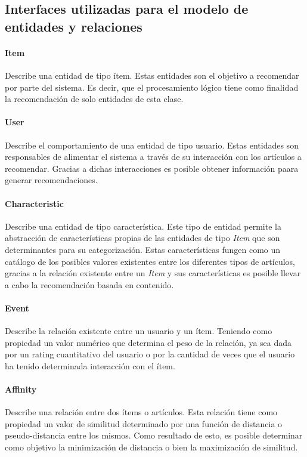 \subsection{Interfaces utilizadas para el modelo de entidades y relaciones}
\paragraph{Item}
Describe una entidad de tipo ítem. Estas entidades son el objetivo a recomendar por parte del sistema. Es decir, que el procesamiento lógico tiene como finalidad la recomendación de solo entidades de esta clase.

\paragraph{User}
Describe el comportamiento de una entidad de tipo usuario. Estas entidades son responsables de alimentar el sistema a través de su interacción con los artículos a recomendar. Gracias a dichas interacciones es posible obtener información paara generar recomendaciones.

\paragraph{Characteristic}
Describe una entidad de tipo característica. Este tipo de entidad permite la abstracción de características propias de las entidades de tipo \emph{Item}  que son determinantes para su categorización. Estas características fungen como un catálogo de los posibles valores existentes entre los diferentes tipos de artículos, gracias a la relación existente entre un \emph{Item} y sus características es posible llevar a cabo la recomendación basada en contenido.

\paragraph{Event}
Describe la relación existente entre un usuario y un ítem. Teniendo como propiedad un valor numérico que determina el peso de la relación, ya sea dada por un rating cuantitativo del usuario o por la cantidad de veces que el usuario ha tenido determinada interacción con el ítem.

\paragraph{Affinity}
Describe una relación entre dos ítems o artículos. Esta relación tiene como propiedad un valor de similitud determinado por una función de distancia o pseudo-distancia entre los mismos. Como resultado de esto, es posible determinar como objetivo la minimización de distancia o bien la maximización de similitud.


